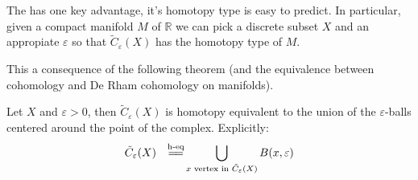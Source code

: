 The {\Cech} has one key advantage,
it's homotopy type is easy to predict.
In particular, given a compact manifold $M$ of $\mathbb{R}$
we can pick a discrete subset $X$ and an appropiate $\varepsilon$
so that $\tilde C_\varepsilon(X)$ has the homotopy type of $M$.

This a consequence of the following theorem (and 
the equivalence between {\Cech} cohomology and De Rham
cohomology on manifolds).

\begin{theorem}
Let $X$ and $\varepsilon>0$, then $\tilde C_\varepsilon(X)$
is homotopy equivalent to the union of the $\varepsilon$-balls centered 
around the point of the complex. Explicitly:
$$
\tilde C_\varepsilon(X)
\quad
\overset{\text{h-eq}}
{{
=
\joinrel=
}}
\displaystyle\bigcup_{x \text{
vertex in 
}
\tilde C_\varepsilon(X)
}
B(x,\varepsilon)
$$
\end{theorem}


